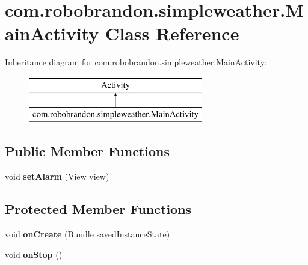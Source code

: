 \hypertarget{classcom_1_1robobrandon_1_1simpleweather_1_1_main_activity}{}\section{com.\+robobrandon.\+simpleweather.\+Main\+Activity Class Reference}
\label{classcom_1_1robobrandon_1_1simpleweather_1_1_main_activity}
Inheritance diagram for com.\+robobrandon.\+simpleweather.\+Main\+Activity\+:\begin{figure}[H]
\begin{center}
\leavevmode
\includegraphics[height=2.000000cm]{classcom_1_1robobrandon_1_1simpleweather_1_1_main_activity}
\end{center}
\end{figure}
\subsection*{Public Member Functions}
\begin{DoxyCompactItemize}
\item 
void {\bfseries set\+Alarm} (View view)\hypertarget{classcom_1_1robobrandon_1_1simpleweather_1_1_main_activity_a0f986012e87d895c48714f2a693f7da9}{}\label{classcom_1_1robobrandon_1_1simpleweather_1_1_main_activity_a0f986012e87d895c48714f2a693f7da9}

\end{DoxyCompactItemize}
\subsection*{Protected Member Functions}
\begin{DoxyCompactItemize}
\item 
void {\bfseries on\+Create} (Bundle saved\+Instance\+State)\hypertarget{classcom_1_1robobrandon_1_1simpleweather_1_1_main_activity_a23ca305fadf606da706cf407937ceee7}{}\label{classcom_1_1robobrandon_1_1simpleweather_1_1_main_activity_a23ca305fadf606da706cf407937ceee7}

\item 
void {\bfseries on\+Stop} ()\hypertarget{classcom_1_1robobrandon_1_1simpleweather_1_1_main_activity_a342fdaa768a8cf6fc71d6f1e30a4209a}{}\label{classcom_1_1robobrandon_1_1simpleweather_1_1_main_activity_a342fdaa768a8cf6fc71d6f1e30a4209a}

\end{DoxyCompactItemize}
